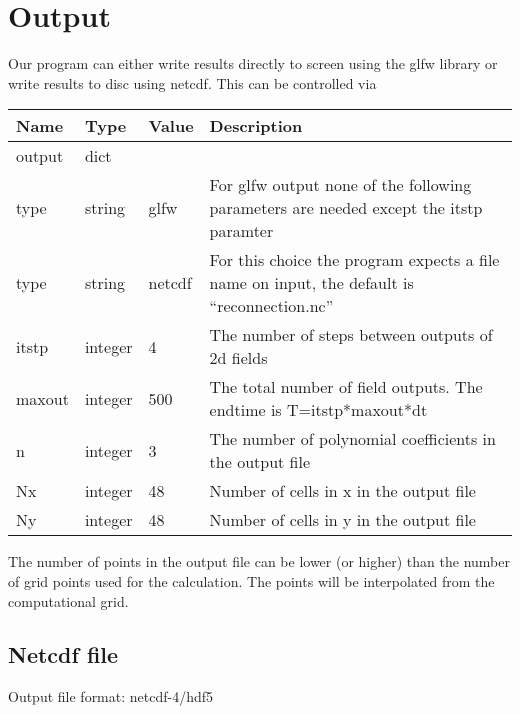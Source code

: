 \section{Output}
Our program can either write results directly to screen using the glfw library
or write results to disc using netcdf.
This can be controlled via
\begin{longtable}{lllp{9cm}}
\toprule
\rowcolor{gray!50}\textbf{Name} &  \textbf{Type} & \textbf{Value}  & \textbf{Description}  \\ \midrule
output & dict & & \\
\qquad type & string & glfw  &  For glfw output none of the following parameters are needed except the itstp paramter\\
\qquad type & string & netcdf  & For this choice the program expects a file name on input, the default is ``reconnection.nc'' \\
\qquad itstp  & integer& 4 & The number of steps between outputs of 2d fields \\
\qquad maxout  & integer& 500 & The total number of field outputs. The endtime is T=itstp*maxout*dt \\
\qquad n  & integer & 3  & The number of polynomial coefficients in the output file\\
\qquad Nx & integer & 48 & Number of cells in x in the output file \\
\qquad Ny & integer & 48 & Number of cells in y in the output file \\
\bottomrule
\end{longtable}
The number of points in the output file can be lower (or higher) than the number of
grid points used for the calculation. The points will be interpolated from the
computational grid.
\subsection{Netcdf file}
Output file format: netcdf-4/hdf5

